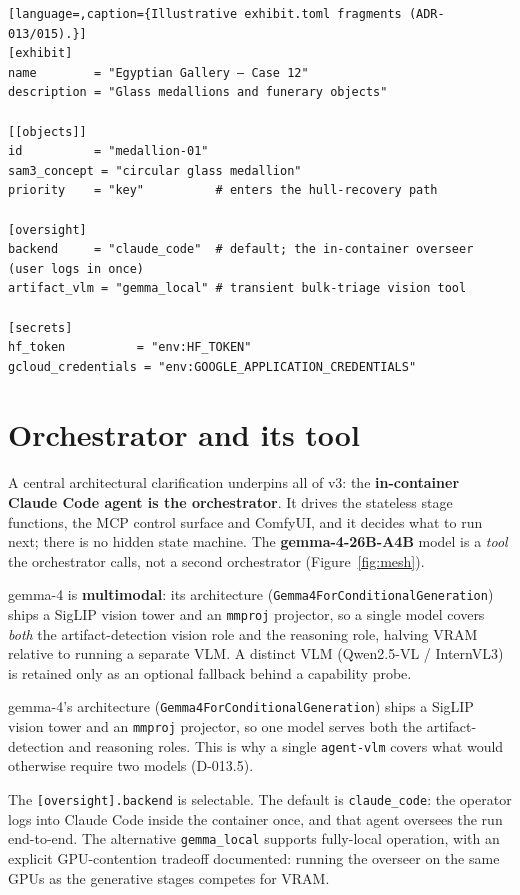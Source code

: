 \documentclass[a4paper,11pt]{report}
\newcommand{\code}[1]{\texttt{#1}}
\begin{document}
\begin{lstlisting}[language=,caption={Illustrative exhibit.toml fragments (ADR-013/015).}]
[exhibit]
name        = "Egyptian Gallery — Case 12"
description = "Glass medallions and funerary objects"

[[objects]]
id          = "medallion-01"
sam3_concept = "circular glass medallion"
priority    = "key"          # enters the hull-recovery path

[oversight]
backend     = "claude_code"  # default; the in-container overseer (user logs in once)
artifact_vlm = "gemma_local" # transient bulk-triage vision tool

[secrets]
hf_token          = "env:HF_TOKEN"
gcloud_credentials = "env:GOOGLE_APPLICATION_CREDENTIALS"
\end{lstlisting}

\section{Orchestrator and its tool}
A central architectural clarification underpins all of v3: the \textbf{in-container Claude Code agent
is the orchestrator}. It drives the stateless stage functions, the MCP control surface and ComfyUI,
and it decides what to run next; there is no hidden state machine. The \textbf{gemma-4-26B-A4B} model
is a \emph{tool} the orchestrator calls, not a second orchestrator (Figure~\ref{fig:mesh}).

gemma-4 is \textbf{multimodal}: its architecture (\code{Gemma4ForConditionalGeneration}) ships a SigLIP
vision tower and an \code{mmproj} projector, so a single model covers \emph{both} the
artifact-detection vision role and the reasoning role, halving VRAM relative to running a separate VLM.
A distinct VLM (Qwen2.5-VL / InternVL3) is retained only as an optional fallback behind a capability
probe.

\begin{technote}
gemma-4's architecture (\code{Gemma4ForConditionalGeneration}) ships a SigLIP vision tower and an
\code{mmproj} projector, so one model serves both the artifact-detection and reasoning roles. This is
why a single \code{agent-vlm} covers what would otherwise require two models (D-013.5).
\end{technote}

The \code{[oversight].backend} is selectable. The default is \code{claude\_code}: the operator logs
into Claude Code inside the container once, and that agent oversees the run end-to-end. The alternative
\code{gemma\_local} supports fully-local operation, with an explicit GPU-contention tradeoff
documented: running the overseer on the same GPUs as the generative stages competes for VRAM.
\end{document}
